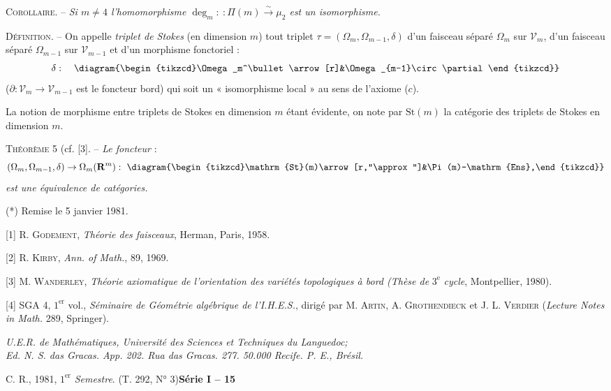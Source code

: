 \textsc{Corollaire}. -- \textit{Si $m\ne4$ l'homomorphisme $\deg_m:\ :\Pi(m)\xrightarrow{\sim}\mu_2$ est un isomorphisme.}

\textsc{Définition}. -- On appelle \textit{triplet de Stokes} (en dimension $m$) tout triplet $\tau=(\Omega_m,\Omega_{m-1},\delta)$ d'un faisceau séparé $\Omega_m$ sur $\mathcal V_m$, d'un faisceau séparé $\Omega_{m-1}$ sur $\mathcal V_{m-1}$ et d'un morphisme fonctoriel :
\[
\delta:\quad\diagram{\begin{tikzcd}\Omega_m^\bullet\arrow[r]&\Omega_{m-1}\circ\partial\end{tikzcd}}
\]
($\partial:\mathcal V_m\to\mathcal V_{m-1}$ est le foncteur bord) qui soit un « isomorphisme local » au sens de l'axiome ($c$).

La notion de morphisme entre triplets de Stokes en dimension $m$ étant évidente, on note par $\mathrm{St}(m)$ la catégorie des triplets de Stokes en dimension $m$.

\textsc{Théorème} 5 (cf. [3]. -- \textit{Le foncteur} :
\[
(\Omega_m,\Omega_{m-1},\delta)\to\Omega_m(\mathbf R^m):\ \diagram{\begin{tikzcd}\mathrm{St}(m)\arrow[r,"\approx"]&\Pi(m)-\mathrm{Ens},\end{tikzcd}}
\]
\textit{est une équivalence de catégories.}

(*) Remise le 5 janvier 1981.

[1] R. \textsc{Godement}, \textit{Théorie des faisceaux}, Herman, Paris, 1958.

[2] R. \textsc{Kirby}, \textit{Ann. of Math.}, 89, 1969.

[3] M. \textsc{Wanderley}, \textit{Théorie axiomatique de l'orientation des variétés topologiques à bord (Thèse de} $3^{\mathrm e}$ \textit{cycle}, Montpellier, 1980).

[4] SGA 4, $1^{\mathrm{er}}$ vol., \textit{Séminaire de Géométrie algébrique de l'I.H.E.S.}, dirigé par M. \textsc{Artin}, A. \textsc{Grothendieck} et J. L. \textsc{Verdier} (\textit{Lecture Notes in Math.} 289, Springer).

\textit{U.E.R. de Mathématiques, Université des Sciences et Techniques du Languedoc;}\\
\textit{Ed. N. S. das Gracas. App. 202. Rua das Gracas. 277. 50.000 Recife. P. E., Brésil.}

C. R., 1981, $1^{\mathrm{er}}$ \textit{Semestre}. (T. 292, N° 3)\hfill\textbf{Série I -- 15}
